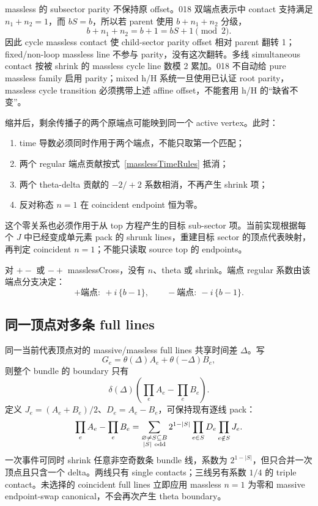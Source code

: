 ﻿\documentclass[a4paper,11pt]{article}
\begin{document}
massless 的 subsector parity 不保持原 offset。018 双端点表示中 contact 支持满足 $n_1+n_2=1$，而 $bS=b$，所以若 parent 使用 $b+n_1+n_2$ 分级，
\begin{equation}
 b+n_1+n_2=b+1=bS+1\pmod 2.
 \label{manualMasslessContactParity}
\end{equation}
因此 cycle massless contact 使 child-sector parity offset 相对 parent 翻转 1；fixed/non-loop massless line 不参与 parity，没有这次翻转。多线 simultaneous contact 按被 shrink 的 massless cycle line 数模 2 累加。018 不自动给 pure massless family 启用 parity；mixed h/H 系统一旦使用已认证 root parity，massless cycle transition 必须携带上述 affine offset，不能套用 h/H 的“缺省不变”。

缩并后，剩余传播子的两个原端点可能映到同一个 active vertex。此时：
\begin{enumerate}
  \item time 导数必须同时作用于两个端点，不能只取第一个匹配；
  \item 两个 regular 端点贡献按式~\eqref{masslessTimeRules} 抵消；
  \item 两个 theta-delta 贡献的 $-2/+2$ 系数相消，不再产生 shrink 项；
  \item 反对称态 $n=1$ 在 coincident endpoint 恒为零。
\end{enumerate}
这个零关系也必须作用于从 top 方程产生的目标 sub-sector 项。当前实现根据每个 $J$ 中已经变成单元素 pack 的 shrunk lines，重建目标 sector 的顶点代表映射，再判定 coincident $n=1$；不能只读取 source top 的 endpoints。

对 $+-$ 或 $-+$ masslessCross，没有 $n$、theta 或 shrink。端点 regular 系数由该端点分支决定：
\begin{equation}
 +\text{端点}:\ +i\,\{b-1\},
 \qquad
 -\text{端点}:\ -i\,\{b-1\}.
\end{equation}

\subsection{同一顶点对多条 full lines}

同一当前代表顶点对的 massive/massless full lines 共享时间差 $\Delta$。写
\begin{equation}
 G_e=\theta(\Delta)A_e+\theta(-\Delta)B_e,
\end{equation}
则整个 bundle 的 boundary 只有
\begin{equation}
 \delta(\Delta)\left(\prod_eA_e-\prod_eB_e\right).
\end{equation}
定义 $J_e=(A_e+B_e)/2$、$D_e=A_e-B_e$，可保持现有逐线 pack：
\begin{equation}
 \prod_eA_e-\prod_eB_e
 =\sum_{\substack{\varnothing\ne S\subseteq B\\|S|\ {\rm odd}}}
 2^{1-|S|}\prod_{e\in S}D_e\prod_{e\notin S}J_e.
 \label{manualOddSubsetContact}
\end{equation}
一次事件可同时 shrink 任意非空奇数条 bundle 线，系数为 $2^{1-|S|}$，但只合并一次顶点且只含一个 delta。两线只有 single contacts；三线另有系数 $1/4$ 的 triple contact。未选择的 coincident full lines 立即应用 massless $n=1$ 为零和 massive endpoint-swap canonical，不会再次产生 theta boundary。
\end{document}
